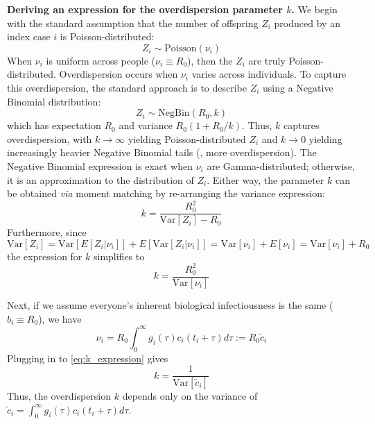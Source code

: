 {\bf \boldmath Deriving an expression for the overdispersion parameter $k$.} We begin with the standard assumption that the number of offspring $Z_i$ produced by an index case $i$ is Poisson-distributed: 
\begin{equation}
	Z_i \sim \text{Poisson}(\nu_i)
\end{equation}
When $\nu_i$ is uniform across people ($\nu_i \equiv R_0$), then the $Z_i$ are truly Poisson-distributed. Overdispersion occurs when $\nu_i$ varies across individuals. To capture this overdispersion, the standard approach is to describe $Z_i$ using a Negative Binomial distribution: 
\begin{equation}
	Z_i \sim \text{NegBin}(R_0, k)
\end{equation}
which has expectation $R_0$ and variance $R_0 (1 + R_0 / k)$. Thus, $k$ captures overdispersion, with $k \rightarrow \infty$ yielding Poisson-distributed $Z_i$ and $k \rightarrow 0$ yielding increasingly heavier Negative Binomial tails (\ie, more overdispersion). The Negative Binomial expression is exact when $\nu_i$ are Gamma-distributed; otherwise, it is an approximation to the distribution of $Z_i$. Either way, the parameter $k$ can be obtained {\it via} moment matching by re-arranging the variance expression: 
\begin{equation}
	k = \frac{R_0^2}{\text{Var}[Z_i] - R_0}
\end{equation}
Furthermore, since
\begin{equation}
	\text{Var}[Z_i] = \text{Var}[E[Z_i | \nu_i]] + E[\text{Var}[Z_i | \nu_i]] = \text{Var}[\nu_i] + E[\nu_i] = \text{Var}[\nu_i] + R_0
\end{equation}
the expression for $k$ simplifies to 
\begin{equation}
	k = \frac{R_0^2}{\text{Var}[\nu_i]}
	\label{eq:k_expression}
\end{equation}

Next, if we assume everyone's inherent biological infectiousness is the same ($b_i \equiv R_0$), we have 
\begin{equation}
	\nu_i = R_0 \int_0^\infty g_i(\tau) c_i(t_i + \tau) d\tau := R_0 \tilde{c}_i
\end{equation}
Plugging in to \ref{eq:k_expression} gives 
\begin{equation}
	\boxed{k = \frac{1}{\text{Var}[\tilde{c}_i]}}
\end{equation}
Thus, the overdispersion $k$ depends only on the variance of $\tilde{c}_i = \int_0^\infty g_i(\tau) c_i(t_i + \tau) d\tau$. 

